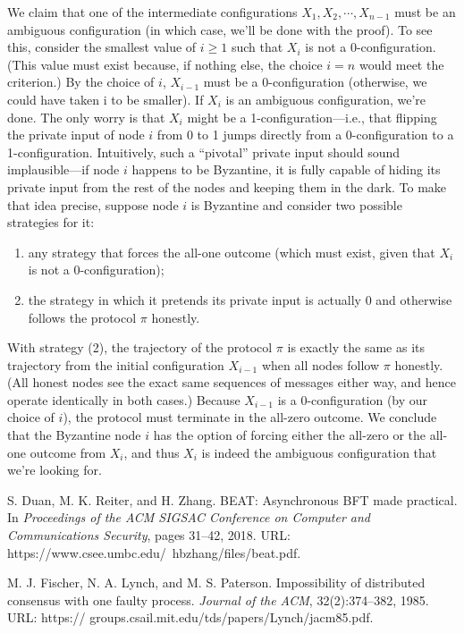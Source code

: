 We claim that one of the intermediate configurations $X_1, X_2, \cdots, X_{n−1}$ must be an ambiguous configuration (in which case, we’ll be done with the proof). To see this, consider the smallest value of $i \geq 1$ such that $X_i$
is not a 0-configuration. (This value must exist because,
if nothing else, the choice $i = n$ would meet the criterion.) By the choice of $i$, $X_{i−1}$ must be
a 0-configuration (otherwise, we could have taken i to be smaller).
If $X_i$ is an ambiguous configuration, we’re done. The only worry is that $X_i$ might be
a 1-configuration—i.e., that flipping the private input of node $i$ from 0 to 1 jumps directly
from a 0-configuration to a 1-configuration. Intuitively, such a “pivotal” private input should
sound implausible—if node $i$ happens to be Byzantine, it is fully capable of hiding its private
input from the rest of the nodes and keeping them in the dark. To make that idea precise,
suppose node $i$ is Byzantine and consider two possible strategies for it:\\
\begin{enumerate}
    \item any strategy that forces the all-one outcome (which must exist, given that $X_i$ is not a 0-configuration);
    \item the strategy in which it pretends its private input is actually 0 and otherwise follows the protocol $\pi$ honestly.
\end{enumerate}
With strategy (2), the trajectory of the protocol $\pi$ is exactly the same as its trajectory from
the initial configuration $X_{i−1}$ when all nodes follow $\pi$ honestly. (All honest nodes see the
exact same sequences of messages either way, and hence operate identically in both cases.)
Because $X_{i−1}$ is a 0-configuration (by our choice of $i$), the protocol must terminate in the
all-zero outcome. We conclude that the Byzantine node $i$ has the option of forcing either the
all-zero or the all-one outcome from $X_i$, and thus $X_i$ is indeed the ambiguous configuration that we’re looking for.

\begingroup
\let\clearpage\relax
\begin{thebibliography}{5}
S. Duan, M. K. Reiter, and H. Zhang. BEAT: Asynchronous BFT made practical. In \textit{Proceedings of the ACM SIGSAC Conference on Computer and Communications Security},
pages 31–42, 2018. URL: https://www.csee.umbc.edu/~hbzhang/files/beat.pdf.

M. J. Fischer, N. A. Lynch, and M. S. Paterson. Impossibility of distributed consensus
with one faulty process. \textit{Journal of the ACM}, 32(2):374–382, 1985. URL: https://
groups.csail.mit.edu/tds/papers/Lynch/jacm85.pdf.

\end{thebibliography}
\endgroup

